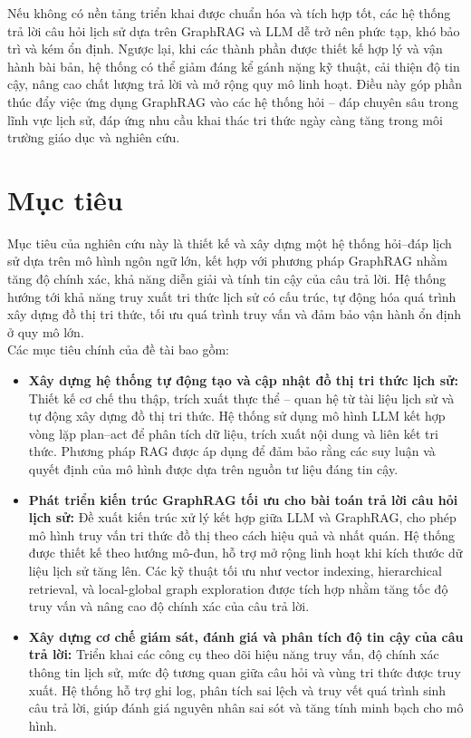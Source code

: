 Nếu không có nền tảng triển khai được chuẩn hóa và tích hợp tốt, các hệ thống trả lời câu hỏi lịch sử dựa trên GraphRAG và LLM dễ trở nên phức tạp, khó bảo trì và kém ổn định. Ngược lại, khi các thành phần được thiết kế hợp lý và vận hành bài bản, hệ thống có thể giảm đáng kể gánh nặng kỹ thuật, cải thiện độ tin cậy, nâng cao chất lượng trả lời và mở rộng quy mô linh hoạt. Điều này góp phần thúc đẩy việc ứng dụng GraphRAG vào các hệ thống hỏi – đáp chuyên sâu trong lĩnh vực lịch sử, đáp ứng nhu cầu khai thác tri thức ngày càng tăng trong môi trường giáo dục và nghiên cứu.

\section{Mục tiêu}
Mục tiêu của nghiên cứu này là thiết kế và xây dựng một hệ thống hỏi–đáp lịch sử dựa trên mô hình ngôn ngữ lớn, kết hợp với phương pháp GraphRAG nhằm tăng độ chính xác, khả năng diễn giải và tính tin cậy của câu trả lời. Hệ thống hướng tới khả năng truy xuất tri thức lịch sử có cấu trúc, tự động hóa quá trình xây dựng đồ thị tri thức, tối ưu quá trình truy vấn và đảm bảo vận hành ổn định ở quy mô lớn. \\
Các mục tiêu chính của đề tài bao gồm:

\begin{itemize}
\item \textbf{Xây dựng hệ thống tự động tạo và cập nhật đồ thị tri thức lịch sử:}
Thiết kế cơ chế thu thập, trích xuất thực thể – quan hệ từ tài liệu lịch sử và tự động xây dựng đồ thị tri thức. Hệ thống sử dụng mô hình LLM kết hợp vòng lặp plan–act để phân tích dữ liệu, trích xuất nội dung và liên kết tri thức. Phương pháp RAG được áp dụng để đảm bảo rằng các suy luận và quyết định của mô hình được dựa trên nguồn tư liệu đáng tin cậy.

\item \textbf{Phát triển kiến trúc GraphRAG tối ưu cho bài toán trả lời câu hỏi lịch sử:}
Đề xuất kiến trúc xử lý kết hợp giữa LLM và GraphRAG, cho phép mô hình truy vấn tri thức đồ thị theo cách hiệu quả và nhất quán. Hệ thống được thiết kế theo hướng mô-đun, hỗ trợ mở rộng linh hoạt khi kích thước dữ liệu lịch sử tăng lên. Các kỹ thuật tối ưu như vector indexing, hierarchical retrieval, và local-global graph exploration được tích hợp nhằm tăng tốc độ truy vấn và nâng cao độ chính xác của câu trả lời.

\item \textbf{Xây dựng cơ chế giám sát, đánh giá và phân tích độ tin cậy của câu trả lời:}
Triển khai các công cụ theo dõi hiệu năng truy vấn, độ chính xác thông tin lịch sử, mức độ tương quan giữa câu hỏi và vùng tri thức được truy xuất. Hệ thống hỗ trợ ghi log, phân tích sai lệch và truy vết quá trình sinh câu trả lời, giúp đánh giá nguyên nhân sai sót và tăng tính minh bạch cho mô hình.

\end{itemize}

